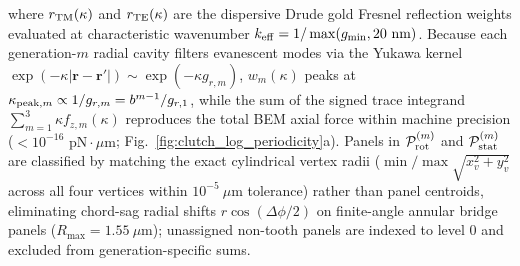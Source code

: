 \documentclass[pdflatex,sn-nature]{sn-jnl}
\begin{document}
where $r_{\rm TM}(\kappa)$ and $r_{\rm TE}(\kappa)$ are the dispersive Drude gold Fresnel reflection weights evaluated at characteristic wavenumber $k_{\rm eff} = 1/\max(g_{\rm min}, 20\text{ nm})$. Because each generation-$m$ radial cavity filters evanescent modes via the Yukawa kernel $\exp(-\kappa |\mathbf{r}-\mathbf{r}'|) \sim \exp(-\kappa g_{r,m})$, $w_m(\kappa)$ peaks at $\kappa_{{\rm peak},m} \propto 1/g_{r,m} = b^{m-1}/g_{r,1}$, while the sum of the signed trace integrand $\sum_{m=1}^{3} \kappa f_{z,m}(\kappa)$ reproduces the total BEM axial force within machine precision ($<10^{-16}\text{ pN}\cdot\mu\text{m}$; Fig.~\ref{fig:clutch_log_periodicity}a). Panels in $\mathcal{P}_{\rm rot}^{(m)}$ and $\mathcal{P}_{\rm stat}^{(m)}$ are classified by matching the exact cylindrical vertex radii ($\min/\max \sqrt{x_v^2 + y_v^2}$ across all four vertices within $10^{-5}\ \mu\text{m}$ tolerance) rather than panel centroids, eliminating chord-sag radial shifts $r\cos(\Delta\phi/2)$ on finite-angle annular bridge panels ($R_{\max} = 1.55\ \mu\text{m}$); unassigned non-tooth panels are indexed to level $0$ and excluded from generation-specific sums.
\end{document}
